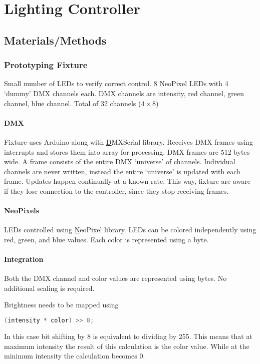 \chapter{Lighting Controller}

\section{Materials/Methods}
\subsection{Prototyping Fixture}
Small number of LEDs to verify correct control.
8 NeoPixel LEDs with 4 `dummy' DMX channels each.
DMX channels are intensity, red channel, green channel, blue channel.
Total of 32 channels (\(4 \times 8\))

\subsubsection{DMX}
Fixture uses Arduino along with
\href{https://github.com/mathertel/DMXSerial}DMXSerial library.
Receives DMX frames using interrupts
and stores them into array for processing.
DMX frames are 512 bytes wide.
A frame consists of the entire DMX `universe' of channels.
Individual channels are never written,
instead the entire `universe' is updated with each frame.
Updates happen continually at a known rate.
This way, fixture are aware if they lose connection to the controller,
since they stop receiving frames.

\subsubsection{NeoPixels}
LEDs controlled using \href{https://github.com/adafruit/Adafruit_NeoPixel}NeoPixel library.
LEDs can be colored independently using red, green, and blue values.
Each color is represented using a byte.

\subsubsection{Integration}
Both the DMX channel and color values are represented using bytes.
No additional scaling is required.

Brightness needs to be mapped using
\begin{lstlisting}[language=C]
  (intensity * color) >> 8;
\end{lstlisting}

In this case bit shifting by 8 is equivalent to dividing by 255.
This means that at maximum intensity the result of this calculation is the color value.
While at the minimum intensity the calculation becomes 0.

